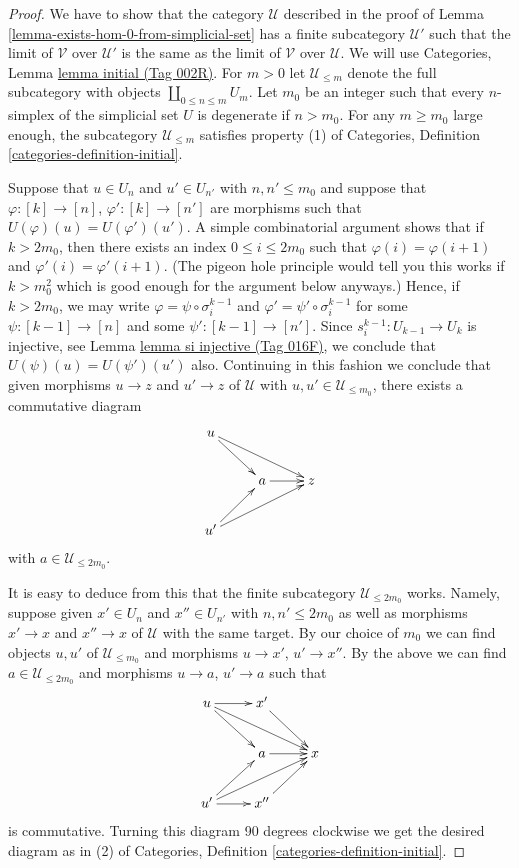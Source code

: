 \documentclass{amsart}
\theoremstyle{plain}
\theoremstyle{definition}
\theoremstyle{remark}
\numberwithin{equation}{subsection}
\begin{document}
\begin{proof}
We have to show that the category $\mathcal{U}$ described
in the proof of Lemma \ref{lemma-exists-hom-0-from-simplicial-set}
has a finite subcategory $\mathcal{U}'$ such that the limit
of $\mathcal{V}$ over $\mathcal{U}'$ is the same as the
limit of $\mathcal{V}$ over $\mathcal{U}$. We will use
Categories, Lemma \href{https://stacks.math.columbia.edu/tag/002R}{lemma initial (Tag 002R)}.
For $m > 0$ let $\mathcal{U}_{\leq m}$ denote the full
subcategory with objects $\coprod_{0 \leq n \leq m} U_m$.
Let $m_0$ be an integer such that every $n$-simplex
of the simplicial set $U$ is degenerate if $n > m_0$.
For any $m \geq m_0$ large enough, the subcategory
$\mathcal{U}_{\leq m}$ satisfies property (1) of
Categories, Definition \ref{categories-definition-initial}.

\medskip\noindent
Suppose that $u \in U_n$ and
$u' \in U_{n'}$ with $n, n' \leq m_0$ and suppose that
$\varphi : [k] \to [n]$, $\varphi' : [k] \to [n']$
are morphisms such that $U(\varphi)(u) = U(\varphi')(u')$.
A simple combinatorial argument shows that if $k > 2m_0$,
then there exists an index $0 \leq i \leq 2m_0$ such that
$\varphi(i) =\varphi(i + 1)$ and $\varphi'(i) = \varphi'(i + 1)$.
(The pigeon hole principle would tell you this works if
$k > m_0^2$ which is good enough for the argument below
anyways.) Hence, if $k > 2m_0$, we may write
$\varphi = \psi \circ \sigma^{k - 1}_i$ and
$\varphi' = \psi' \circ \sigma^{k - 1}_i$ for some
$\psi : [k - 1] \to [n]$ and some $\psi' : [k - 1] \to [n']$.
Since $s^{k - 1}_i : U_{k - 1} \to U_k$ is injective,
see Lemma \href{https://stacks.math.columbia.edu/tag/016F}{lemma si injective (Tag 016F)}, we conclude that
$U(\psi)(u) = U(\psi')(u')$ also. Continuing in this
fashion we conclude that given morphisms
$u \to z$ and $u' \to z$ of $\mathcal{U}$
with $u, u' \in \mathcal{U}_{\leq m_0}$, there exists
a commutative diagram
$$
\xymatrix{
u \ar[rd] \ar[rrd] & & \\
& a \ar[r] & z \\
u' \ar[ru] \ar[rru]
}
$$
with $a \in \mathcal{U}_{\leq 2m_0}$.

\medskip\noindent
It is easy to deduce from this that the finite subcategory
$\mathcal{U}_{\leq 2m_0}$ works. Namely, suppose given
$x' \in U_n$ and $x'' \in U_{n'}$ with $n, n' \leq 2m_0$ as well as
morphisms $x' \to x$ and $x'' \to x$ of $\mathcal{U}$
with the same target. By our choice of $m_0$ we can
find objects $u, u'$ of $\mathcal{U}_{\leq m_0}$ and
morphisms $u \to x'$, $u' \to x''$.
By the above we can find $a \in \mathcal{U}_{\leq 2m_0}$
and morphisms $u \to a$, $u' \to a$ such that
$$
\xymatrix{
u \ar[rd] \ar[rrd] \ar[r] & x' \ar[rd] & \\
& a \ar[r] & x \\
u' \ar[ru] \ar[rru] \ar[r] & x'' \ar[ru] &
}
$$
is commutative. Turning this diagram 90 degrees clockwise
we get the desired diagram as in (2) of
Categories, Definition \ref{categories-definition-initial}.
\end{proof}
\end{document}

